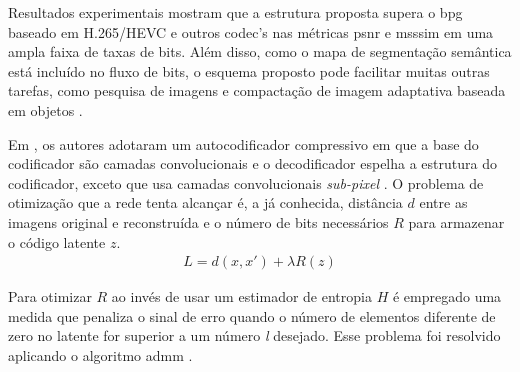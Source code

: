 
Resultados experimentais mostram que a estrutura proposta supera o \acrshort{bpg} baseado em H.265/HEVC e outros \acrshort{codec}'s nas métricas \acrshort{psnr} e \acrshort{msssim} em uma ampla faixa de taxas de bits. Além disso, como o mapa de segmentação semântica está incluído no fluxo de bits, o esquema proposto pode facilitar muitas outras tarefas, como pesquisa de imagens e compactação de imagem adaptativa baseada em objetos \cite{akbari2019dsslic}.


Em \cite{zhao1901cae}, os autores adotaram um autocodificador compressivo em que a base do codificador são camadas convolucionais e o decodificador espelha a estrutura do codificador, exceto que usa  camadas convolucionais \textit{sub-pixel} \cite{li2018learning}. O problema de otimização que a rede tenta alcançar é, a já conhecida, distância $d$ entre as imagens original e reconstruída e o número de bits necessários $R$ para armazenar o código latente $z$.
\begin{equation}
\begin{aligned}
L = d(x,x') + \lambda R(z) 
\end{aligned}
\end{equation}

Para otimizar $R$ ao invés de usar um estimador de entropia $H$ é empregado uma medida que penaliza o sinal de erro quando o número de elementos diferente de zero no latente for superior a um número \textit{l} desejado. Esse problema foi resolvido aplicando o algoritmo \acrshort{admm} \cite{ye2018progressive}. 




